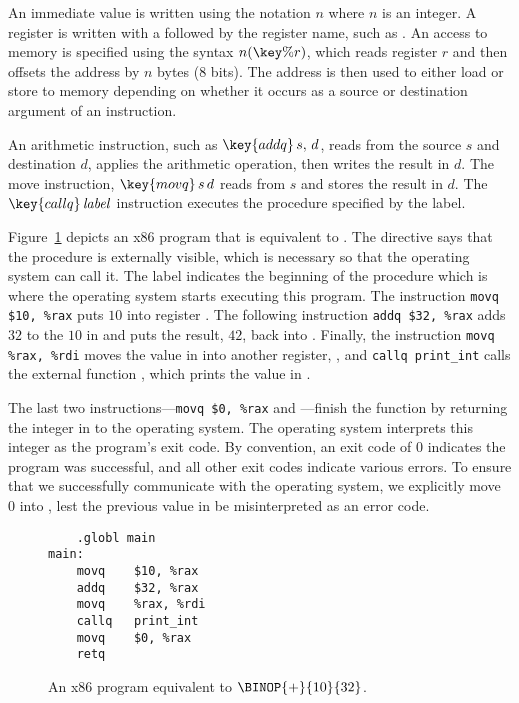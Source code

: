 \documentclass[11pt]{book}
\newcommand{\margincomment}[1]{\marginpar{#1}}
\newcommand{\margincomment}[1]{}
\begin{document}
An immediate value is written using the notation \key{\$}$n$ where $n$
is an integer.
%
A register is written with a \key{\%} followed by the register name,
such as .
%
An access to memory is specified using the syntax $n(\key{\%}r)$,
which reads register $r$ and then offsets the address by $n$ bytes
(8 bits). The address is then used to either load or store to memory
depending on whether it occurs as a source or destination argument of
an instruction.

An arithmetic instruction, such as $\key{addq}\,s,\,d$, reads from the
source $s$ and destination $d$, applies the arithmetic operation, then
writes the result in $d$.
%
The move instruction, $\key{movq}\,s\,d$ reads from $s$ and stores the
result in $d$.
%
The $\key{callq}\,\mathit{label}$ instruction executes the procedure
specified by the label.

Figure~\ref{fig:p0-x86} depicts an x86 program that is equivalent
to . The  directive says that the
 procedure is externally visible, which is necessary so
that the operating system can call it. The label 
indicates the beginning of the  procedure which is where
the operating system starts executing this program.  The instruction
\lstinline{movq $10, %rax} puts $10$ into register . The
following instruction \lstinline{addq $32, %rax} adds $32$ to the
$10$ in  and puts the result, $42$, back into
. Finally, the instruction \lstinline{movq %rax, %rdi} moves the value
in  into another register, , and
\lstinline{callq print_int} calls the external function , which
prints the value in .

The last two instructions---\lstinline{movq $0, %rax} and ---finish
the  function by returning the integer in  to the
operating system. The operating system interprets this integer as the program's
exit code. By convention, an exit code of 0 indicates the program was
successful, and all other exit codes indicate various errors. To ensure that
we successfully communicate with the operating system, we explicitly move 0
into , lest the previous value in  be misinterpreted as an
error code.


\begin{figure}[tbp]
\begin{lstlisting}
	.globl main
main:
	movq	$10, %rax
	addq	$32, %rax
	movq	%rax, %rdi
	callq	print_int
	movq    $0, %rax
	retq
\end{lstlisting}
\caption{An x86 program equivalent to $\BINOP{+}{10}{32}$.}
\label{fig:p0-x86}
\end{figure}
\end{document}
